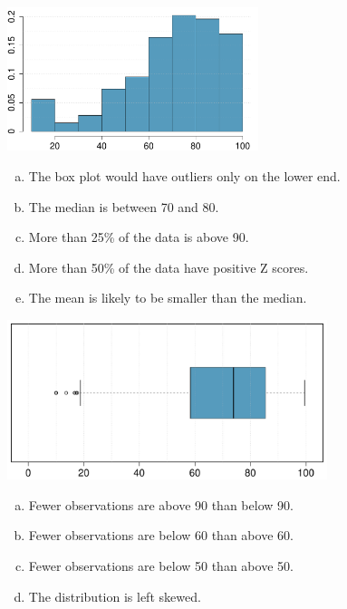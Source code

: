 \documentclass[11pt,containsverbatim,handout,xcolor=xelatex,dvipsnames,table]{beamer}
\newcommand{\solnMult}[1]{#1}
\begin{document}
\begin{frame}


\begin{center}
\includegraphics[width=0.55\textwidth]{figures/num_data/rel_hist}
\end{center}

\begin{enumerate}[(a)]
\item The box plot would have outliers only on the lower end.
\item The median is between 70 and 80.
\item \solnMult{More than 25\% of the data is above 90.}
\item More than 50\% of the data have positive Z scores.
\item The mean is likely to be smaller than the median.
\end{enumerate}

\end{frame}


\begin{frame}


\begin{center}
\includegraphics[width=0.7\textwidth]{figures/num_data/boxplot}
\end{center}

\begin{enumerate}[(a)]
\item Fewer observations are above 90 than below 90.
\item \solnMult{Fewer observations are below 60 than above 60.}
\item Fewer observations are below 50 than above 50.
\item The distribution is left skewed.
\end{enumerate}

\end{frame}
\end{document}
